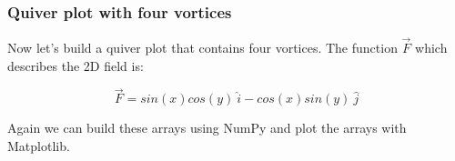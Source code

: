 \documentclass{book}
\begin{document}
    \begin{center}
    \end{center}
    { \hspace*{\fill} \\}
    

    
        \subsubsection{Quiver plot with four
vortices}\label{quiver-plot-with-four-vortices}

Now let's build a quiver plot that contains four vortices. The function
\(\vec{F}\) which describes the 2D field is:

\[ \vec{F} = sin(x)cos(y) \ \hat{i} -cos(x)sin(y) \ \hat{j} \]

Again we can build these arrays using NumPy and plot the arrays with
Matplotlib.
    
\end{document}
